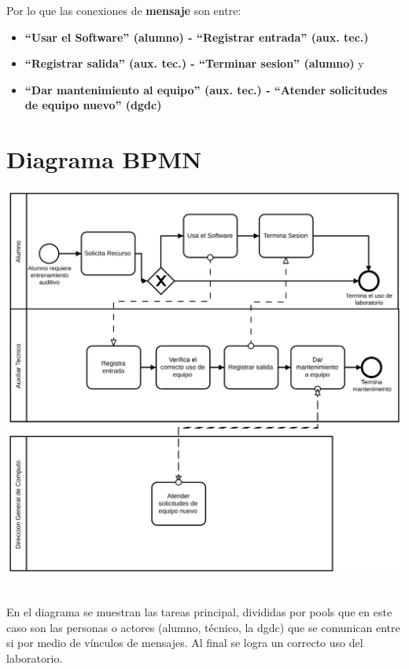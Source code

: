 \documentclass[spanish,12pt,letterpapper]{article}
\begin{document}
	Por lo que las conexiones de \textbf{mensaje} son entre:

	\begin{itemize}
	 \item \textbf{``Usar el Software'' (alumno) - ``Registrar entrada'' (aux. tec.)} 
	 \item \textbf{``Registrar salida'' (aux. tec.) - ``Terminar sesion'' (alumno)} y 
	 \item \textbf{``Dar mantenimiento al equipo'' (aux. tec.) - ``Atender solicitudes de equipo nuevo'' (dgdc)}
	\end{itemize}

	
	\section{Diagrama BPMN}
	
	\begin{center}
	\includegraphics[width=1\textwidth]{./bpmn}~\\[1cm]
	\end{center}
	
	En el diagrama se muestran las tareas principal, divididas por pools que en este caso son las personas o actores (alumno, técnico, la dgdc) que se comunican entre si por medio de vínculos de mensajes. Al final se logra un correcto uso del laboratorio.
	
\end{document}
